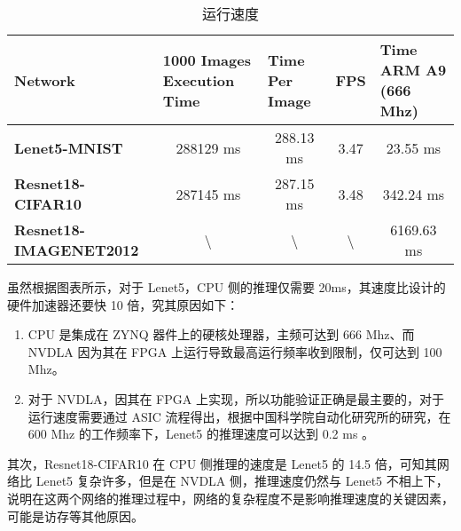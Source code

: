 \begin{table}[!htbp]
    \caption{运行速度}
    \label{tab:Execution Time}
    \centering
    \footnotesize%
    \setlength{\tabcolsep}{4pt}%
    \renewcommand{\arraystretch}{1.2}%
    \begin{tabular}{lcccc}
        \toprule
        \textbf{Network}                                   & \multicolumn{1}{l}{\textbf{1000 Images Execution Time}} & \multicolumn{1}{l}{\textbf{Time Per Image}} & \textbf{FPS}     & \multicolumn{1}{l}{\textbf{Time ARM A9 (666 Mhz)}} \\
        \midrule
        \textbf{Lenet5-MNIST}          & 288129 ms                                               & 288.13 ms                                   & 3.47             & 23.55 ms                                            \\
        \textbf{Resnet18-CIFAR10}      & 287145 ms                                               & 287.15 ms                                   & 3.48             & 342.24 ms                                          \\
        \textbf{Resnet18-IMAGENET2012} & \textbackslash{}                                        & \textbackslash{}                            & \textbackslash{} & 6169.63 ms                                         \\
        \bottomrule                   
    \end{tabular}
\end{table}

虽然根据图表所示，对于 Lenet5，CPU 侧的推理仅需要 20ms，其速度比设计的硬件加速器还要快 10 倍，究其原因如下：

\begin{enumerate}
    \item CPU 是集成在 ZYNQ 器件上的硬核处理器，主频可达到 666 Mhz、而 NVDLA 因为其在 FPGA 上运行导致最高运行频率收到限制，仅可达到 100 Mhz。
    \item 对于 NVDLA，因其在 FPGA 上实现，所以功能验证正确是最主要的，对于运行速度需要通过 ASIC 流程得出，根据中国科学院自动化研究所的研究，在 600 Mhz 的工作频率下，Lenet5 的推理速度可以达到 0.2 ms \cite{9040769}。 
\end{enumerate}

其次，Resnet18-CIFAR10 在 CPU 侧推理的速度是 Lenet5 的 14.5 倍，可知其网络比 Lenet5 复杂许多，但是在 NVDLA 侧，推理速度仍然与 Lenet5 不相上下，说明在这两个网络的推理过程中，网络的复杂程度不是影响推理速度的关键因素，可能是访存等其他原因。